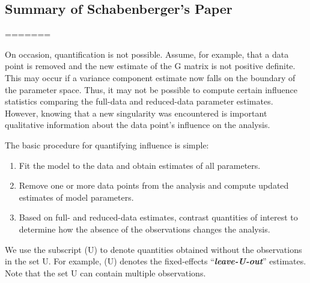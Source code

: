 \documentclass[12pt, a4paper]{report}
\theoremstyle{plain}
\theoremstyle{definition}
\theoremstyle{remark}
\begin{document}
%	
%	
\subsection{Summary of Schabenberger's Paper}
=======
\newpage

On occasion, quantification is not possible. Assume, for example, that a data point is removed
and the new estimate of the G matrix is not positive definite. This may occur if a variance component
estimate now falls on the boundary of the parameter space. Thus, it may not be possible to compute certain
influence statistics comparing the full-data and reduced-data parameter estimates. However, knowing that
a new singularity was encountered is important qualitative information about the data point’s influence on
the analysis.

The basic procedure for quantifying influence is simple:

\begin{enumerate}
	\item Fit the model to the data and obtain estimates of all parameters.
	\item Remove one or more data points from the analysis and compute updated estimates of model parameters.
	\item Based on full- and reduced-data estimates, contrast quantities of interest to determine how the absence
	of the observations changes the analysis.
\end{enumerate}
We use the subscript (U) to denote quantities obtained without the observations in the set U. For example,
(U) denotes the fixed-effects “\textit{\textbf{leave-U-out}}” estimates. Note that the set U can contain multiple observations.
\end{document}
